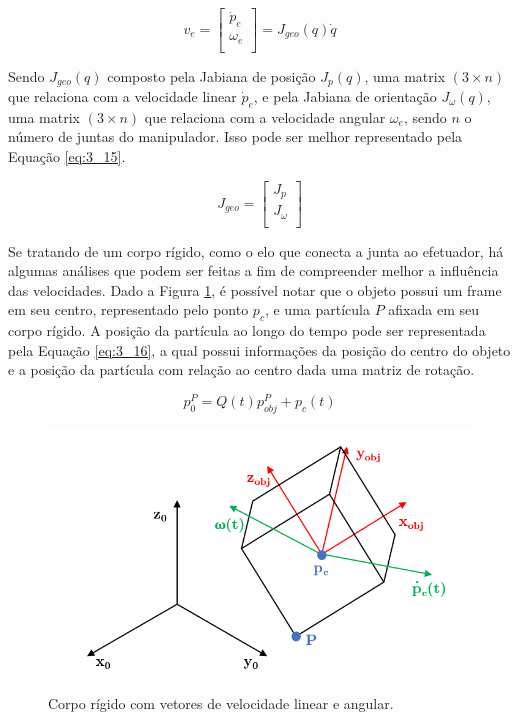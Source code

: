 \begin{equation}
v_e = 
\begin{bmatrix}
\dot{p}_e\\
\omega_e\\
\end{bmatrix} = J_{geo}(q)\dot{q}
\label{eq:3_14}
\end{equation}

Sendo $J_{geo}(q)$ composto pela Jabiana de posição $J_p(q)$, uma matrix $(3 \times n)$ que relaciona com a velocidade linear $\dot{p}_e$, e pela Jabiana de orientação $J_{\omega}(q)$, uma matrix $(3 \times n)$ que relaciona com a velocidade angular $\omega_e$, sendo $n$ o número de juntas do manipulador. Isso pode ser melhor representado pela Equação \ref{eq:3_15}.

\begin{equation}
J_{geo} = 
\begin{bmatrix}
J_p\\
J_{\omega}\\
\end{bmatrix}
\label{eq:3_15}
\end{equation}

Se tratando de um corpo rígido, como o elo que conecta a junta ao efetuador, há algumas análises que podem ser feitas a fim de compreender melhor a influência das velocidades. Dado a Figura \ref{fig:CorpoRig}, é possível notar que o objeto possui um frame em seu centro, representado pelo ponto $p_c$, e uma partícula $P$ afixada em seu corpo rígido. A posição da partícula ao longo do tempo pode ser representada pela Equação \ref{eq:3_16}, a qual possui informações da posição do centro do objeto e a posição da partícula com relação ao centro dada uma matriz de rotação.

\begin{equation}
p^P_0 = Q(t)p^P_{obj} + p_c(t)
\label{eq:3_16}
\end{equation}

\begin{figure}[t!]
\centering
\includegraphics[width=0.7\columnwidth]{Imagens/CorpoRig.PNG}
\caption{Corpo rígido com vetores de velocidade linear e angular.}
\label{fig:CorpoRig}
\end{figure}

